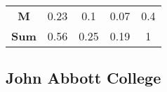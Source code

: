 \documentclass[]{book}
\theoremstyle{definition}
\theoremstyle{definition}
\theoremstyle{remark}
\begin{document}
\begin{longtable}[]{@{}ccccc@{}}
\begin{minipage}[t]{0.12\columnwidth}
\textbf{M}\strut
\end{minipage} & \begin{minipage}[t]{0.06\columnwidth}\centering\strut
0.23\strut
\end{minipage} & \begin{minipage}[t]{0.06\columnwidth}\centering\strut
0.1\strut
\end{minipage} & \begin{minipage}[t]{0.06\columnwidth}\centering\strut
0.07\strut
\end{minipage} & \begin{minipage}[t]{0.06\columnwidth}\centering\strut
0.4\strut
\end{minipage}\tabularnewline
\begin{minipage}[t]{0.12\columnwidth}\centering\strut
\textbf{Sum}\strut
\end{minipage} & \begin{minipage}[t]{0.06\columnwidth}\centering\strut
0.56\strut
\end{minipage} & \begin{minipage}[t]{0.06\columnwidth}\centering\strut
0.25\strut
\end{minipage} & \begin{minipage}[t]{0.06\columnwidth}\centering\strut
0.19\strut
\end{minipage} & \begin{minipage}[t]{0.06\columnwidth}\centering\strut
1\strut
\end{minipage}\tabularnewline
\bottomrule
\end{longtable}

\subsection{John Abbott College}\label{john-abbott-college}
\end{document}
